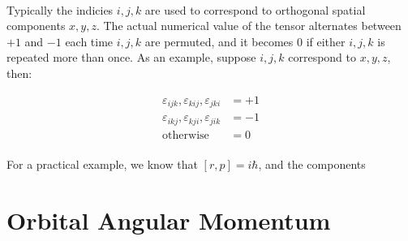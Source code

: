 \documentclass[12pt,letterpaper]{book}
\begin{document}
\paragraph*{}Typically the indicies $i,j,k$ are used to correspond to orthogonal spatial components $x,y,z$. The actual numerical value of the tensor alternates between $+1$ and $-1$ each time $i,j,k$ are permuted, and it becomes $0$ if either $i,j,k$ is repeated more than once. As an example, suppose $i,j,k$ correspond to $x,y,z$, then:

\begin{equation}
\begin{split}
\varepsilon_{ijk},\varepsilon_{kij},\varepsilon_{jki} &= +1 \\
\varepsilon_{ikj},\varepsilon_{kji},\varepsilon_{jik} &= -1 \\
\text{otherwise} &= 0
\end{split}
\end{equation}

\paragraph*{}For a practical example, we know that $[r,p] = i\hbar$, and the components 




\section{Orbital Angular Momentum}
\end{document}
